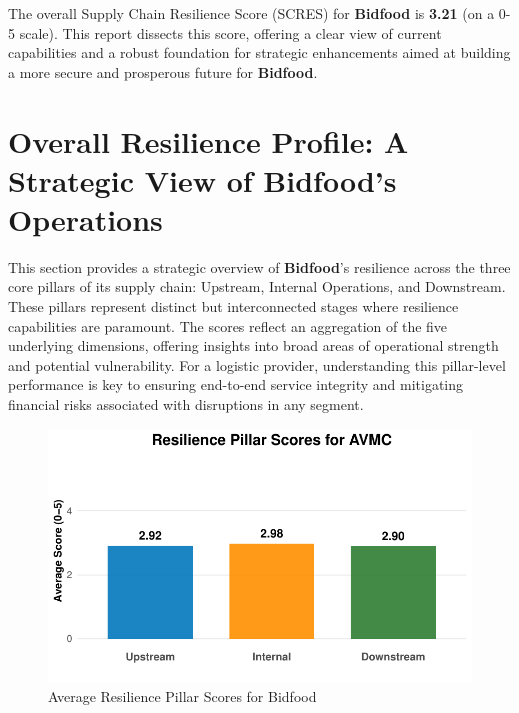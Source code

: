 \documentclass[
  oneside,
  open=any,
  fontsize=11pt]{scrbook}
\begin{document}
The overall Supply Chain Resilience Score (SCRES) for \textbf{Bidfood}
is \textbf{3.21} (on a 0-5 scale). This report dissects this score,
offering a clear view of current capabilities and a robust foundation
for strategic enhancements aimed at building a more secure and
prosperous future for \textbf{Bidfood}.

\chapter{Overall Resilience Profile: A Strategic View of Bidfood's
Operations}\label{overall-resilience-profile-a-strategic-view-of-bidfoods-operations}

This section provides a strategic overview of \textbf{Bidfood}'s
resilience across the three core pillars of its supply chain: Upstream,
Internal Operations, and Downstream. These pillars represent distinct
but interconnected stages where resilience capabilities are paramount.
The scores reflect an aggregation of the five underlying dimensions,
offering insights into broad areas of operational strength and potential
vulnerability. For a logistic provider, understanding this pillar-level
performance is key to ensuring end-to-end service integrity and
mitigating financial risks associated with disruptions in any segment.

\begin{figure}[H]

{\centering \includegraphics[width=1\linewidth,height=\textheight,keepaspectratio]{example_3_files/figure-pdf/pillar-scores-chart-1.pdf}

}

\caption{Average Resilience Pillar Scores for Bidfood}

\end{figure}%
\end{document}
